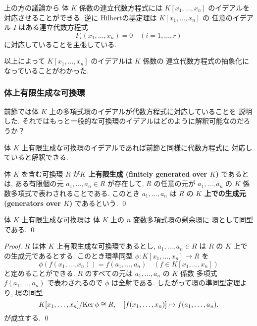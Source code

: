 \documentclass[12pt,twoside]{jarticle}
\begin{document}
上の方の議論から
体 $K$ 係数の連立代数方程式には $K[x_1,\ldots,x_n]$ 
のイデアルを対応させることができる.
逆に Hilbertの基定理は $K[x_1,\ldots,x_n]$ の
任意のイデアル $I$ はある連立代数方程式
\begin{equation*}
 F_i(x_1,\ldots,x_n) = 0 \quad (i=1,\ldots,r)
\end{equation*}
に対応していることを主張している. 

以上によって $K[x_1,\ldots,x_n]$ のイデアルは $K$ 係数の
連立代数方程式の抽象化になっていることがわかった.

\subsubsection{体上有限生成な可換環}

前節では体 $K$ 上の多項式環のイデアルが代数方程式に対応していることを
説明した.  
それではもっと一般的な可換環のイデアルはどのように解釈可能なのだろうか？

体 $K$ 上有限生成な可換環のイデアルであれば前節と同様に代数方程式に
対応していると解釈できる.

\begin{definition}[体 $K$ 上有限生成]
 体 $K$ を含む可換環 $R$ が{\bf $K$ 上有限生成 (finitely generated over $K$)}
 であるとは, ある有限個の元 $a_1,\ldots,a_n\in R$ が存在して, 
 $R$ の任意の元が $a_1,\ldots,a_n$ の $K$ 係数多項式で表わされることである.
 このとき $a_1,\ldots,a_n$ は $R$ 
 の {\bf $K$ 上での生成元 (generators over $K$)} であるという.
 \qed
\end{definition}

\begin{lemma}
 \label{lemma:R=K[x1,..,xn]/I}
 体 $K$ 上有限生成な可換環は
 体 $K$ 上の $n$ 変数多項式環の剰余環に
 環として同型である. \qed
\end{lemma}

\begin{proof}
 $R$ は体 $K$ 上有限生成な可換環であるとし, 
 $a_1,\ldots,a_n\in R$ は $R$ の $K$ 上での生成元であるとする.
 このとき環準同型 $\phi:K[x_1,\ldots,x_n]\to R$ を
 \begin{equation*}
  \phi(f(x_1,\ldots,x_n)) = f(a_1,\ldots,a_n) 
  \quad (f\in K[x_1,\ldots,x_n])
 \end{equation*}
 と定めることができる.  $R$ のすべての元は $a_1,\ldots, a_n$ の $K$ 係数
 多項式 $f(a_1,\ldots,a_n)$ で表わされるので $\phi$ は全射である.
 したがって環の準同型定理より, 環の同型
 \begin{equation*}
  K[x_1,\ldots,x_n]/\!\mathop{\mathrm{Ker}}\nolimits\phi \cong R, 
  \quad [f(x_1,\ldots,x_n)]\mapsto f(a_1,\ldots,a_n).
 \end{equation*}
 が成立する. \qed
\end{proof}
\end{document}

